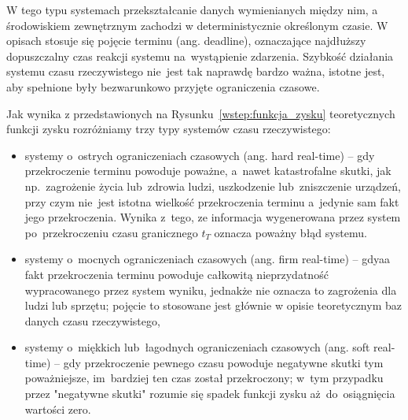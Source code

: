 W tego typu systemach przekształcanie danych wymienianych między nim, a środowiskiem zewnętrznym zachodzi w deterministycznie określonym czasie. W opisach stosuje się pojęcie terminu (ang. deadline), oznaczające najdłuższy dopuszczalny czas reakcji systemu na~wystąpienie zdarzenia.
Szybkość działania systemu czasu rzeczywistego nie~jest tak naprawdę bardzo ważna, istotne jest, aby spełnione były bezwarunkowo przyjęte ograniczenia czasowe.

Jak wynika z przedstawionych na Rysunku~\ref{wstep:funkcja_zysku} teoretycznych funkcji zysku rozróżniamy trzy typy systemów czasu rzeczywistego:
\begin{itemize}
\item systemy o~ostrych ograniczeniach czasowych (ang. hard real-time) -- gdy przekroczenie terminu powoduje poważne, a~nawet katastrofalne skutki, jak np.~zagrożenie życia lub~zdrowia ludzi, uszkodzenie lub~zniszczenie urządzeń, przy czym nie~jest istotna wielkość przekroczenia terminu a~jedynie sam fakt jego przekroczenia. Wynika z~tego, ze informacja wygenerowana przez system po~przekroczeniu czasu granicznego $t_T$ oznacza poważny błąd systemu.

\item systemy o~mocnych ograniczeniach czasowych (ang. firm real-time) -- gdyaa fakt przekroczenia terminu powoduje całkowitą nieprzydatność wypracowanego przez system wyniku, jednakże nie oznacza to zagrożenia dla ludzi lub sprzętu; pojęcie to stosowane jest głównie w opisie teoretycznym baz danych czasu rzeczywistego,

\item systemy o~miękkich lub~łagodnych ograniczeniach czasowych (ang. soft real-time) -- gdy przekroczenie pewnego czasu powoduje negatywne skutki tym poważniejsze, im~bardziej ten czas został przekroczony; w~tym przypadku przez "negatywne skutki" rozumie się spadek funkcji zysku aż~do~osiągnięcia wartości zero.
\end{itemize}

